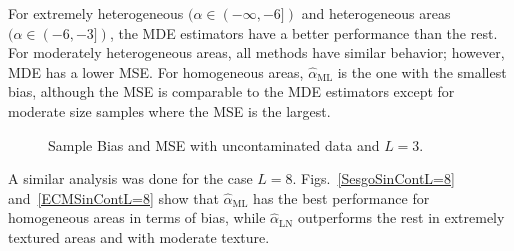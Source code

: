\documentclass[twocolumn]{svjour3}
\begin{document}
	For extremely heterogeneous $(\alpha \in (-\infty,-6])$ and heterogeneous areas $(\alpha \in (-6,-3])$, the MDE estimators have a better performance than the rest. 
	For moderately heterogeneous areas, all methods have similar behavior; however, MDE has a lower MSE. 
	For homogeneous areas, $\widehat{\alpha}_{\text{{ML}}}$ is the one with the smallest bias, although the MSE is comparable to the MDE estimators except for moderate size samples where the MSE is the largest.
	
	\begin{figure}[hbt]
		\centering
		\caption{Sample Bias and MSE with uncontaminated data and $L=3$.}\label{SesgoyECMSinContL=3} 
	\end{figure}    
	
	A similar analysis was done for the case $L=8$. Figs.~\ref{SesgoSinContL=8} and~\ref{ECMSinContL=8} show that $\widehat{\alpha}_{\text{{ML}}}$ has the best performance for homogeneous
	areas in terms of bias, while $\widehat{\alpha}_{\text{{LN}}}$ outperforms the rest in extremely textured areas and with moderate texture.
	
\end{document}
